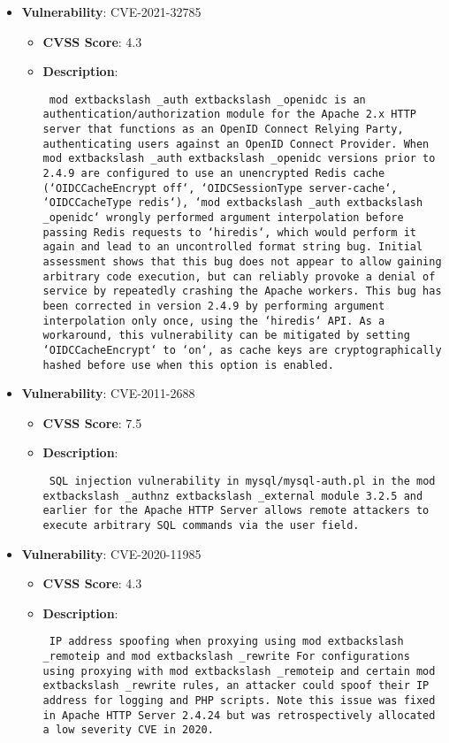 \documentclass{article}
\begin{document}
\begin{itemize}
        \item \textbf{Vulnerability}: CVE-2021-32785
        \begin{itemize}
            \item \textbf{CVSS Score}:  4.3 
            \item \textbf{Description}: \parbox{\linewidth}{\texttt{ mod	extbackslash _auth	extbackslash _openidc is an authentication/authorization module for the Apache 2.x HTTP server that functions as an OpenID Connect Relying Party, authenticating users against an OpenID Connect Provider. When mod	extbackslash _auth	extbackslash _openidc versions prior to 2.4.9 are configured to use an unencrypted Redis cache (`OIDCCacheEncrypt off`, `OIDCSessionType server-cache`, `OIDCCacheType redis`), `mod	extbackslash _auth	extbackslash _openidc` wrongly performed argument interpolation before passing Redis requests to `hiredis`, which would perform it again and lead to an uncontrolled format string bug. Initial assessment shows that this bug does not appear to allow gaining arbitrary code execution, but can reliably provoke a denial of service by repeatedly crashing the Apache workers. This bug has been corrected in version 2.4.9 by performing argument interpolation only once, using the `hiredis` API. As a workaround, this vulnerability can be mitigated by setting `OIDCCacheEncrypt` to `on`, as cache keys are cryptographically hashed before use when this option is enabled. }}
        \end{itemize}
    
        \item \textbf{Vulnerability}: CVE-2011-2688
        \begin{itemize}
            \item \textbf{CVSS Score}:  7.5 
            \item \textbf{Description}: \parbox{\linewidth}{\texttt{ SQL injection vulnerability in mysql/mysql-auth.pl in the mod	extbackslash _authnz	extbackslash _external module 3.2.5 and earlier for the Apache HTTP Server allows remote attackers to execute arbitrary SQL commands via the user field. }}
        \end{itemize}
    
        \item \textbf{Vulnerability}: CVE-2020-11985
        \begin{itemize}
            \item \textbf{CVSS Score}:  4.3 
            \item \textbf{Description}: \parbox{\linewidth}{\texttt{ IP address spoofing when proxying using mod	extbackslash _remoteip and mod	extbackslash _rewrite For configurations using proxying with mod	extbackslash _remoteip and certain mod	extbackslash _rewrite rules, an attacker could spoof their IP address for logging and PHP scripts. Note this issue was fixed in Apache HTTP Server 2.4.24 but was retrospectively allocated a low severity CVE in 2020. }}
        \end{itemize}
    

\end{itemize}
\end{document}

